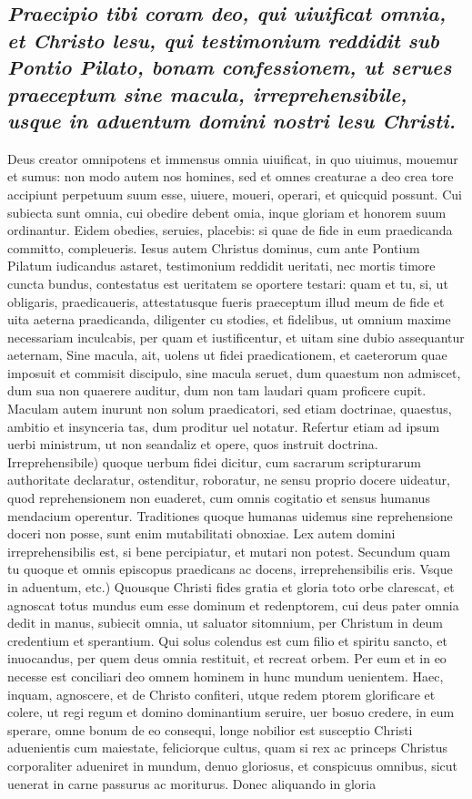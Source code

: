\documentclass{article}
\begin{document}
\begin{pages}
\subsection*{\textit{Praecipio tibi coram deo, qui uiuificat omnia, et Christo lesu, qui testimonium reddidit sub Pontio Pilato, bonam confessionem, ut serues praeceptum sine macula, irreprehensibile, usque in aduentum domini nostri lesu Christi. }}\pstart Deus creator omnipotens et immensus omnia uiuificat, in quo uiuimus, mouemur et sumus: non modo autem nos homines, sed et omnes creaturae a deo crea tore accipiunt perpetuum suum esse, uiuere, moueri, operari, et quicquid possunt. Cui subiecta sunt omnia, cui obedire debent omia, inque gloriam et honorem suum ordinantur. Eidem obedies, seruies, placebis: si quae de fide in eum praedicanda committo, compleueris. Iesus autem Christus dominus, cum ante Pontium Pilatum iudicandus astaret, testimonium reddidit ueritati, nec mortis timore cuncta bundus, contestatus est ueritatem se oportere testari: quam et tu, si, ut obligaris, praedicaueris, attestatusque fueris praeceptum illud meum de fide et uita aeterna praedicanda, diligenter cu stodies, et fidelibus, ut omnium maxime necessariam inculcabis, per quam et iustificentur, et uitam sine dubio assequantur aeternam, Sine macula, ait, uolens ut fidei praedicationem, et caeterorum quae imposuit et commisit discipulo, sine macula seruet, dum quaestum non admiscet, dum sua non quaerere auditur, dum non tam laudari quam proficere cupit. Maculam autem inurunt non solum praedicatori, sed etiam doctrinae, quaestus, ambitio et insynceria tas, dum proditur uel notatur. Refertur etiam ad ipsum uerbi ministrum, ut non seandaliz et opere, quos instruit doctrina. Irreprehensibile) quoque uerbum fidei dicitur, cum sacrarum scripturarum authoritate declaratur, ostenditur, roboratur, ne sensu proprio docere uideatur, quod reprehensionem non euaderet, cum omnis cogitatio et sensus humanus mendacium operentur. Traditiones quoque  humanas uidemus sine reprehensione doceri non posse, sunt enim mutabilitati obnoxiae. Lex autem domini irreprehensibilis est, si bene percipiatur, et mutari non potest. Secundum quam tu quoque et omnis episcopus praedicans ac docens, irreprehensibilis eris. Vsque in aduentum, etc.) Quousque Christi fides gratia et gloria toto orbe clarescat, et agnoscat totus mundus eum esse dominum et redenptorem, cui deus pater omnia dedit in manus, subiecit omnia, ut saluator sitomnium, per Christum in deum credentium et sperantium. Qui solus colendus est cum filio et spiritu sancto, et inuocandus, per quem deus omnia restituit, et recreat orbem. Per eum et in eo necesse est conciliari deo omnem hominem in hunc mundum uenientem. Haec, inquam, agnoscere, et de Christo confiteri, utque redem ptorem glorificare et colere, ut regi regum et domino dominantium seruire, uer bosuo credere, in eum sperare, omne bonum de eo consequi, longe nobilior est susceptio Christi aduenientis cum maiestate, feliciorque cultus, quam si rex ac princeps Christus corporaliter adueniret in mundum, denuo gloriosus, et conspicuus omnibus, sicut uenerat in carne passurus ac moriturus. Donec aliquando in gloria  \pend

\end{pages}
\end{document}
